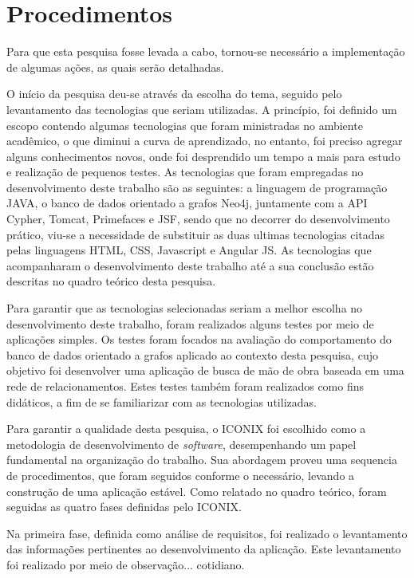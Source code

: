 \section{Procedimentos}

\par Para que esta pesquisa fosse levada a cabo, tornou-se necessário a implementação de algumas ações, as quais serão detalhadas.

\par O início da pesquisa deu-se através da escolha do tema, seguido pelo levantamento das tecnologias que seriam utilizadas. A princípio, foi definido um escopo contendo algumas tecnologias que foram ministradas no ambiente acadêmico, o que diminui a curva de aprendizado, no entanto, foi preciso agregar alguns conhecimentos novos, onde foi desprendido um tempo a mais para estudo e realização de pequenos testes. As tecnologias que foram empregadas no desenvolvimento deste trabalho são as seguintes: a linguagem de programação JAVA, o banco de dados orientado a grafos Neo4j, juntamente com a API Cypher, Tomcat, Primefaces e JSF, sendo que no decorrer do desenvolvimento prático, viu-se a necessidade de substituir as duas ultimas tecnologias citadas pelas linguagens HTML, CSS, Javascript e Angular JS. As tecnologias que acompanharam o desenvolvimento deste trabalho até a sua conclusão estão descritas no quadro teórico desta pesquisa.

\par Para garantir que as tecnologias selecionadas seriam a melhor escolha no desenvolvimento deste trabalho, foram realizados alguns testes por meio de aplicações simples. Os testes foram focados na avaliação do comportamento do banco de dados orientado a grafos aplicado ao contexto desta pesquisa, cujo objetivo foi desenvolver uma aplicação de busca de mão de obra baseada em uma rede de relacionamentos. Estes testes também foram realizados como fins didáticos, a fim de se familiarizar com as tecnologias utilizadas.

\par Para garantir a qualidade desta pesquisa, o ICONIX foi escolhido como a metodologia de desenvolvimento de \textit{software}, desempenhando um papel fundamental na organização do trabalho. Sua abordagem proveu uma sequencia de procedimentos, que foram seguidos conforme o necessário, levando a construção de uma aplicação estável. Como relatado no quadro teórico, foram seguidas as quatro fases definidas pelo ICONIX.
\par Na primeira fase, definida como análise de requisitos, foi realizado o levantamento das informações pertinentes ao desenvolvimento da aplicação. Este levantamento foi realizado por meio de observação... cotidiano. 






